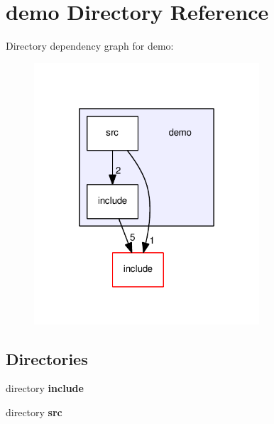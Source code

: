 \section{demo Directory Reference}
\label{dir_9f99e9aaac6a5168261f9990a00e0b03}
Directory dependency graph for demo\-:\nopagebreak
\begin{figure}[H]
\begin{center}
\leavevmode
\includegraphics[width=238pt]{dir_9f99e9aaac6a5168261f9990a00e0b03_dep}
\end{center}
\end{figure}
\subsection*{Directories}
\begin{DoxyCompactItemize}
\item 
directory {\bf include}
\item 
directory {\bf src}
\end{DoxyCompactItemize}
